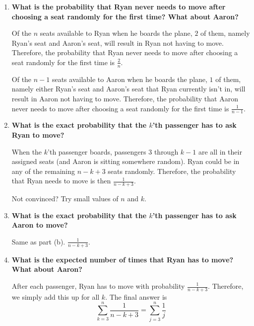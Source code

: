 \documentclass{article}
\begin{document}
\begin{enumerate}[label=(\alph*)]
    \item \textbf{What is the probability that Ryan never needs to move after choosing a seat randomly for the first time? What about Aaron?}
    
    Of the $n$ seats available to Ryan when he boards the plane, $2$ of them, namely Ryan's seat and Aaron's seat, will result in Ryan not having to move. Therefore, the probability that Ryan never needs to move after choosing a seat randomly for the first time is $\boxed{\frac{2}{n}}$.
    
    \vspace{0.2cm}
    
    Of the $n-1$ seats available to Aaron when he boards the plane, $1$ of them, namely either Ryan's seat and Aaron's seat that Ryan currently isn't in, will result in Aaron not having to move. Therefore, the probability that Aaron never needs to move after choosing a seat randomly for the first time is $\boxed{\frac{1}{n-1}}$.

    \vspace{2cm}
    
    \item \textbf{What is the exact probability that the $k$'th passenger has to ask Ryan to move?}
    
    When the $k$'th passenger boards, passengers $3$ through $k - 1$ are all in their assigned seats (and Aaron is sitting somewhere random). Ryan could be in any of the remaining $n - k + 3$ seats randomly. Therefore, the probability that Ryan needs to move is then $\boxed{\frac{1}{n - k + 3}}$.
    
    Not convinced? Try small values of $n$ and $k$.

    \vspace{2cm}

    \item \textbf{What is the exact probability that the $k$'th passenger has to ask Aaron to move?}
    
    Same as part (b). $\boxed{\frac{1}{n - k + 3}}$.

    \vspace{2cm}

    \item \textbf{What is the expected number of times that Ryan has to move? What about Aaron?}
    
    After each passenger, Ryan has to move with probability $\frac{1}{n - k + 3}$. Therefore, we simply add this up for all $k$. The final answer is $$\sum_{k = 3}^n \frac{1}{n - k + 3} = \boxed{\sum_{j = 3}^n \frac{1}{j}}$$
    

\end{enumerate}
\end{document}

